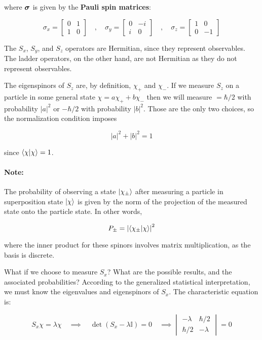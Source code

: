 \documentclass[12pt, titlepage]{article}
\newcommand{\Sx}{\begin{bmatrix} 0 & 1 \\ 1 & 0\end{bmatrix}}
\newcommand{\Sy}{\begin{bmatrix} 0 & -i \\ i & 0\end{bmatrix}}
\newcommand{\Sz}{\begin{bmatrix} 1 & 0 \\ 0 & -1\end{bmatrix}}
\begin{document}
where $\vb*{\sigma}$ is given by the \textbf{Pauli spin matrices}:

\begin{equation}
\boxed{
	\sigma_x = \Sx \quad,\quad
	\sigma_y = \Sy \quad,\quad
	\sigma_z = \Sz }
\end{equation}

The $S_x$, $S_y$, and $S_z$ operators are Hermitian, since they represent observables. The ladder operators, on the other hand, are not Hermitian as they do not represent observables. 

The eigenspinors of $S_z$ are, by definition, $\chi_+$ and $\chi_-$. If we measure $S_z$ on a particle in some general state $\chi = a\chi_+ + b\chi_-$ then we will measure $=\hbar/2$ with probability $|a|^2$ or $-\hbar/2$ with probability $|b|^2$. Those are the only two choices, so the normalization condition imposes

\begin{equation}
	|a|^2 + |b|^2 = 1
\end{equation}

since $\bra{\chi}\ket{\chi} = 1$. 

\begin{mdframed}
\paragraph*{Note:} The probability of observing a state $\ket{\chi_\pm}$ after measuring a particle in superposition state $\ket{\chi}$ is given by the norm of the projection of the measured state onto the particle state. In other words,

\begin{equation}
	P_\pm = \qty|\bra{\chi_\pm}\ket{\chi}|^2
\end{equation}

where the inner product for these spinors involves matrix multiplication, as the basis is discrete.
\end{mdframed}

What if we choose to measure $S_x$? What are the possible results, and the associated probabilities? According to the generalized statistical interpretation, we must know the eigenvalues and eigenspinors of $S_x$. The characteristic equation is:

\begin{equation*}
	S_x\chi = \lambda\chi \quad\implies\quad \det(S_x-\lambda\mathbb{I}) = 0 \quad\implies \begin{vmatrix}-\lambda & \hbar/2 \\ \hbar/2 & -\lambda \end{vmatrix} = 0
\end{equation*}
\end{document}
